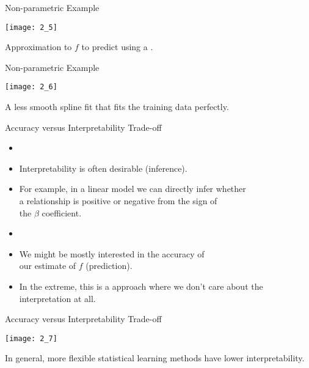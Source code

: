 \documentclass[mathserif, aspectratio=169]{beamer}
\begin{document}
\begin{frame}{Non-parametric Example}
	\vspace{-5mm}
	\begin{center}
		\texttt{[image: 2\_5]}

		Approximation to $f$ to predict  using a . 
	\end{center}
\end{frame}

\begin{frame}{Non-parametric Example}
	\vspace{-5mm}
	\begin{center}
		\texttt{[image: 2\_6]}

		A less smooth spline fit that fits the training data perfectly. 
	\end{center}
\end{frame}

\begin{frame}{Accuracy versus Interpretability Trade-off}
	\begin{cpage}
		\begin{itemize}
			\item[] 
			\item Interpretability is often desirable (inference).
			\item For example, in a linear model we can directly infer whether\\
				a relationship is positive or negative from the sign of\\
				the $\beta$ coefficient.
			\item[] 
			\item We might be mostly interested in the accuracy of\\
				our estimate of $f$ (prediction).
			\item In the extreme, this is a  approach where we don't care about
				the interpretation at all.
		\end{itemize}
	\end{cpage}
\end{frame}

\begin{frame}{Accuracy versus Interpretability Trade-off}
	\vspace{-5mm}
	\begin{center}
		\texttt{[image: 2\_7]}

		In general, more flexible statistical learning methods have lower interpretability.
	\end{center}
\end{frame}
\end{document}
